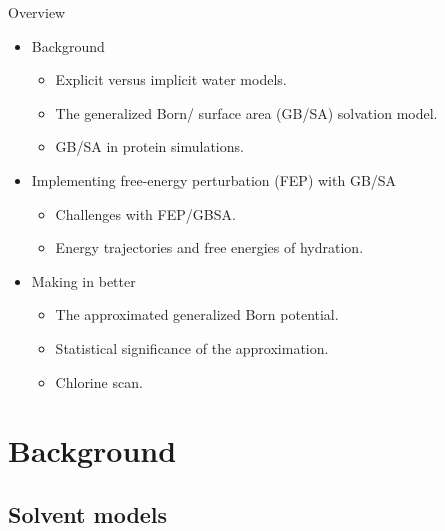 \documentclass[10pt]{beamer}
\begin{document}
\begin{frame}{Overview}

\begin{itemize}
    \item Background
    \begin{itemize}
    \item Explicit versus implicit water models.
    \item The generalized Born/ surface area (GB/SA) solvation model. 
    \item GB/SA in protein simulations.
    \end{itemize}
    \item Implementing free-energy perturbation (FEP) with GB/SA
    \begin{itemize}
    \item Challenges with FEP/GBSA.
    \item Energy trajectories and free energies of hydration.
    \end{itemize}
    \item Making in better
    \begin{itemize}
    \item The approximated generalized Born potential. 
    \item Statistical significance of the approximation.
    \item Chlorine scan.
    \end{itemize}
\end{itemize}

\end{frame}


\section{Background}


\subsection{Solvent models}
\end{document}
